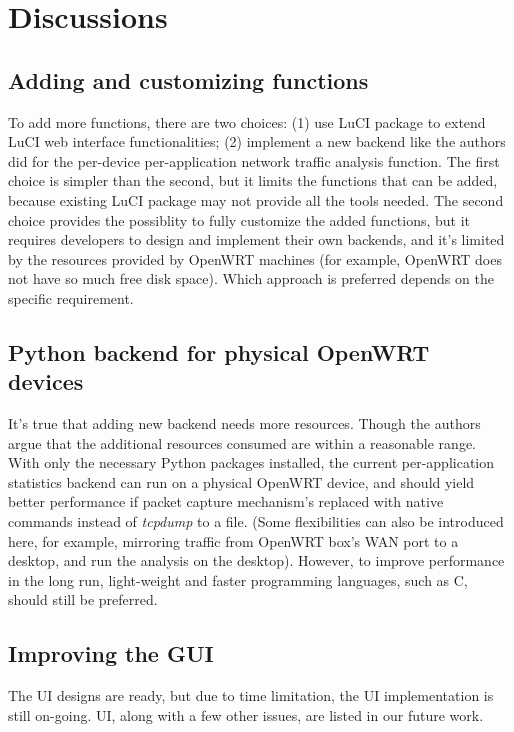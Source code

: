 \section{Discussions}

\subsection{Adding and customizing functions}
To add more functions, there are two choices: (1) use LuCI package to extend LuCI web interface functionalities; (2) implement a new backend like the authors did for the per-device per-application network traffic analysis function. The first choice is simpler than the second, but it limits the functions that can be added, because existing LuCI package may not provide all the tools needed. The second choice provides the possiblity to fully customize the added functions, but it requires developers to design and implement their own backends, and it's limited by the resources provided by OpenWRT machines (for example, OpenWRT does not have so much free disk space). Which approach is preferred depends on the specific requirement.

\subsection{Python backend for physical OpenWRT devices}

It's true that adding new backend needs more resources. Though the authors argue that the additional resources consumed are within a reasonable range. With only the necessary Python packages installed, the current per-application statistics backend can run on a physical OpenWRT device, and should yield better performance if packet capture mechanism's replaced with native commands instead of \textit{tcpdump} to a file. (Some flexibilities can also be introduced here, for example, mirroring traffic from OpenWRT box's WAN port to a desktop, and run the analysis on the desktop). However, to improve performance in the long run, light-weight and faster programming languages, such as C, should still be preferred.

\subsection{Improving the GUI}

The UI designs are ready, but due to time limitation, the UI implementation is still on-going. UI, along with a few other issues, are listed in our future work.